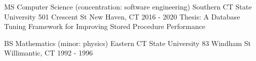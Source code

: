 

\begin{cventries}

  \cventry
    {MS Computer Science (concentration: software engineering)} %
    {Southern CT State University} %
    {501 Crescent St New Haven, CT} %
    {2016 - 2020} %
    {Thesis: A Database Tuning Framework for Improving Stored Procedure Performance
    }
    
  \cventry
    {BS Mathematics (minor: physics)} %
    {Eastern CT State University} %
    {83 Windham St Willimantic, CT} %
    {1992 - 1996} %
    {
    }

\end{cventries}
